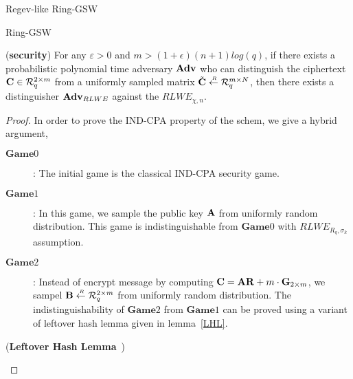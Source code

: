 \begin{subsection}{Regev-like Ring-GSW}
\begin{paragraph}{Ring-GSW}
    \begin{lemma}{(\textbf{security})}
      For any $\varepsilon > 0$ and $m > (1+\epsilon)(n+1) log(q)$,
      if there exists a probabilistic polynomial time adversary $\mathbf{Adv}$ who can distinguish the ciphertext $\mathbf{C} \in {\mathcal{R}}_q^{2 \times m}$
      from a uniformly sampled matrix $\tilde{\mathbf{C}} \stackrel{{\scriptscriptstyle \mkern4mu R}}{\gets} {\mathcal{R}}_q^{m \times N}$,
      then there exists a distinguisher $\mathbf{Adv}_{RLWE}$ against the $RLWE_{\chi, n}$.
    \end{lemma}
    \begin{proof}
      In order to prove the IND-CPA property of the schem, we give a hybrid argument,
      \begin{description}
      \item[$\textbf{Game} 0$]:
        The initial game is the classical IND-CPA security game.
      \item[$\textbf{Game} 1$]:
        In this game, we sample the public key $\mathbf{A}$ from uniformly random distribution. This game is indistinguishable from $\textbf{Game} 0$ with $RLWE_{R_q, \sigma_k}$ assumption.
      \item[$\textbf{Game} 2$]:
        Instead of encrypt message by computing $\mathbf{C} = \mathbf{A} \mathbf{R} + m \cdot \mathbf{G}_{2\times m}$, we sampel $\mathbf{B} \stackrel{{\scriptscriptstyle \mkern4mu R}}{\gets} {\mathcal{R}}_q^{2 \times m}$ from uniformly random distribution.
        The indistinguishability of $\textbf{Game} 2$ from $\textbf{Game} 1$ can be proved using a variant of leftover hash lemma given in lemma~\ref{LHL}.
      \end{description}
      \begin{lemma}\label{LHL}{(\textbf{Leftover Hash Lemma}~\cite{DBLP:conf/stoc/ImpagliazzoLL89}\cite{DBLP:journals/jacm/Regev09})}
      \end{lemma}
    \end{proof}
  \end{paragraph}
  
\end{subsection}

